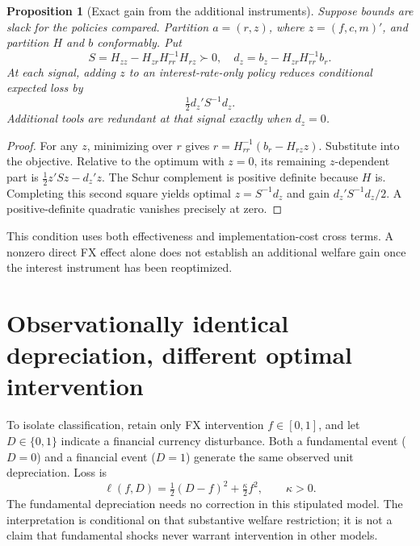 \documentclass[11pt]{article}
\newtheorem{proposition}{Proposition}
\theoremstyle{definition}
\begin{document}
\begin{proposition}[Exact gain from the additional instruments]
Suppose bounds are slack for the policies compared. Partition $a=(r,z)$, where $z=(f,c,m)'$, and partition $H$ and $b$ conformably. Put
\[
 S=H_{zz}-H_{zr}H_{rr}^{-1}H_{rz}\succ0,
 \quad d_z=b_z-H_{zr}H_{rr}^{-1}b_r.
\]
At each signal, adding $z$ to an interest-rate-only policy reduces conditional expected loss by
\[
 \tfrac12 d_z'S^{-1}d_z.
\]
Additional tools are redundant at that signal exactly when $d_z=0$.
\end{proposition}
\begin{proof}
For any $z$, minimizing over $r$ gives $r=H_{rr}^{-1}(b_r-H_{rz}z)$. Substitute into the objective. Relative to the optimum with $z=0$, its remaining $z$-dependent part is $\frac12z'Sz-d_z'z$. The Schur complement is positive definite because $H$ is. Completing this second square yields optimal $z=S^{-1}d_z$ and gain $d_z'S^{-1}d_z/2$. A positive-definite quadratic vanishes precisely at zero.
\end{proof}
This condition uses both effectiveness and implementation-cost cross terms. A nonzero direct FX effect alone does not establish an additional welfare gain once the interest instrument has been reoptimized.

\section*{Observationally identical depreciation, different optimal intervention}
To isolate classification, retain only FX intervention $f\in[0,1]$, and let $D\in\{0,1\}$ indicate a financial currency disturbance. Both a fundamental event ($D=0$) and a financial event ($D=1$) generate the same observed unit depreciation. Loss is
\[
 \ell(f,D)=\tfrac12(D-f)^2+\tfrac\kappa2 f^2,\qquad\kappa>0.
\]
The fundamental depreciation needs no correction in this stipulated model. The interpretation is conditional on that substantive welfare restriction; it is not a claim that fundamental shocks never warrant intervention in other models.
\end{document}
